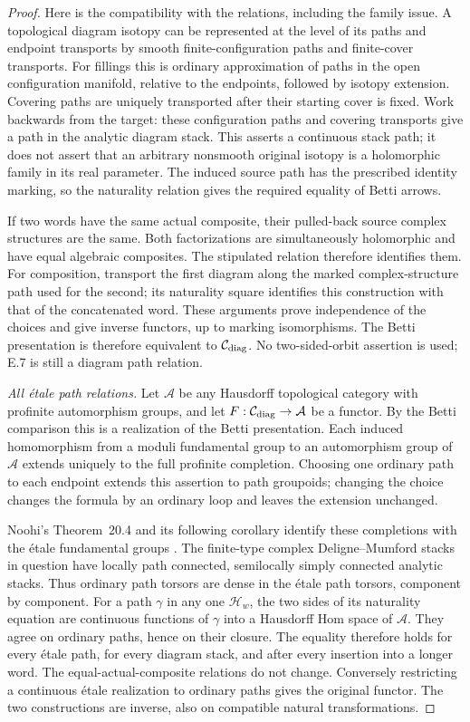 \begin{proof}
Here is the compatibility with the relations, including the
family issue. A topological diagram isotopy can be represented
at the level of its paths and endpoint transports by smooth
finite-configuration paths and finite-cover transports. For
fillings this is ordinary approximation of paths in the open
configuration manifold, relative to the endpoints, followed
by isotopy extension. Covering paths are uniquely transported
after their starting cover is fixed. Work backwards from the
target: these configuration paths and covering transports
give a path in the analytic diagram stack. This asserts a
continuous stack path; it does not assert that an arbitrary
nonsmooth original isotopy is a holomorphic family in its
real parameter. The induced source path has the prescribed
identity marking, so the naturality relation gives the
required equality of Betti arrows.

If two words have the same actual composite, their pulled-back
source complex structures are the same. Both factorizations
are simultaneously holomorphic and have equal algebraic
composites. The stipulated relation therefore identifies them.
For composition, transport the first diagram along the marked
complex-structure path used for the second; its naturality
square identifies this construction with that of the concatenated
word. These arguments prove independence of the choices and
give inverse functors, up to marking isomorphisms. The Betti
presentation is therefore equivalent to $\mathcal C_{\rm diag}$.
No two-sided-orbit assertion is used; E.7 is still a diagram
path relation.

\emph{All \'etale path relations.}
Let $\mathcal A$ be any Hausdorff topological category with
profinite automorphism groups, and let
$F:\mathcal C_{\rm diag}\to\mathcal A$ be a functor.
By the Betti comparison this is a realization of the Betti
presentation. Each induced homomorphism from a moduli
fundamental group to an automorphism group of $\mathcal A$
extends uniquely to the full profinite completion. Choosing
one ordinary path to each endpoint extends this assertion
to path groupoids; changing the choice changes the formula
by an ordinary loop and leaves the extension unchanged.

Noohi's Theorem~20.4 and its following corollary identify
these completions with the \'etale fundamental groups
\citep{E_Noohi2005}. The finite-type complex Deligne--Mumford
stacks in question have locally path connected, semilocally
simply connected analytic stacks. Thus ordinary path torsors
are dense in the \'etale path torsors, component by component.
For a path $\gamma$ in any one $\mathcal H_w$, the two sides
of its naturality equation are continuous functions of
$\gamma$ into a Hausdorff Hom space of $\mathcal A$.
They agree on ordinary paths, hence on their closure.
The equality therefore holds for every \'etale path, for
every diagram stack, and after every insertion into a
longer word. The equal-actual-composite relations do not
change. Conversely restricting a continuous \'etale
realization to ordinary paths gives the original functor.
The two constructions are inverse, also on compatible
natural transformations.


\end{proof}
